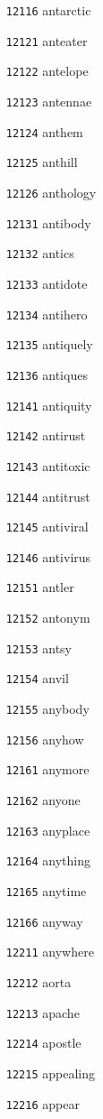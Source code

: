 \documentclass[twoside,11pt]{article}
\begin{document}
\begin{multicols}{5}
\begin{enumerate}
\item[\texttt{12116}] antarctic
\item[\texttt{12121}] anteater
\item[\texttt{12122}] antelope
\item[\texttt{12123}] antennae
\item[\texttt{12124}] anthem
\item[\texttt{12125}] anthill
\item[\texttt{12126}] anthology
\item[\texttt{12131}] antibody
\item[\texttt{12132}] antics
\item[\texttt{12133}] antidote
\item[\texttt{12134}] antihero
\item[\texttt{12135}] antiquely
\item[\texttt{12136}] antiques
\item[\texttt{12141}] antiquity
\item[\texttt{12142}] antirust
\item[\texttt{12143}] antitoxic
\item[\texttt{12144}] antitrust
\item[\texttt{12145}] antiviral
\item[\texttt{12146}] antivirus
\item[\texttt{12151}] antler
\item[\texttt{12152}] antonym
\item[\texttt{12153}] antsy
\item[\texttt{12154}] anvil
\item[\texttt{12155}] anybody
\item[\texttt{12156}] anyhow
\item[\texttt{12161}] anymore
\item[\texttt{12162}] anyone
\item[\texttt{12163}] anyplace
\item[\texttt{12164}] anything
\item[\texttt{12165}] anytime
\item[\texttt{12166}] anyway
\item[\texttt{12211}] anywhere
\item[\texttt{12212}] aorta
\item[\texttt{12213}] apache
\item[\texttt{12214}] apostle
\item[\texttt{12215}] appealing
\item[\texttt{12216}] appear

\end{enumerate}
\end{multicols}
\end{document}

